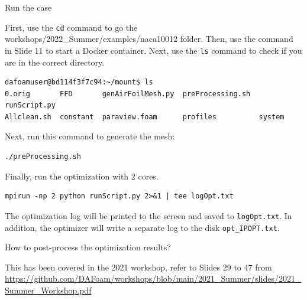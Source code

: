 \documentclass{bredelebeamer}
\begin{document}
\begin{frame}[fragile]{Run the case}

  First, use the \texttt{cd} command to go the workshops/2022\_Summer/examples/naca10012 folder. Then, use the command in Slide 11 to start a Docker container. Next, use the \texttt{ls} command to check if you are in the correct directory.
  \footnotesize
  \lstset{ language=bash }
  \begin{lstlisting}
dafoamuser@bd114f3f7c94:~/mount$ ls
0.orig       FFD       genAirFoilMesh.py  preProcessing.sh  runScript.py
Allclean.sh  constant  paraview.foam      profiles          system
  \end{lstlisting}
  \normalsize

  Next, run this command to generate the mesh:
  \footnotesize
  \lstset{ language=bash }
  \begin{lstlisting}
./preProcessing.sh
  \end{lstlisting}
  \normalsize

  Finally, run the optimization with 2 cores.
  \footnotesize
  \lstset{ language=bash }
  \begin{lstlisting}
mpirun -np 2 python runScript.py 2>&1 | tee logOpt.txt
  \end{lstlisting}
  \normalsize

  The optimization log will be printed to the screen and saved to \texttt{logOpt.txt}. In addition, the optimizer will write a separate log to the disk \texttt{opt\_IPOPT.txt}.

\end{frame}

\begin{frame}[fragile]{How to post-process the optimization results?}

  This has been covered in the 2021 workshop, refer to Slides 29 to 47 from 
  \url{https://github.com/DAFoam/workshops/blob/main/2021_Summer/slides/2021_Summer_Workshop.pdf}

\end{frame}
\end{document}
